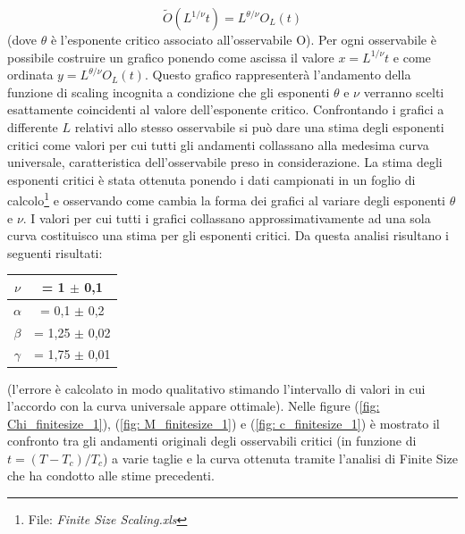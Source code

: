 \begin{displaymath}
	\tilde{O}(L^{1/ \nu} t ) = L^{\theta / \nu}O_L(t)
\end{displaymath}
(dove $\theta$ è l'esponente critico associato all'osservabile O).
Per ogni osservabile è possibile costruire un grafico ponendo come ascissa il valore $x = L^{1/ \nu} t $ e come ordinata
$y = L^{\theta / \nu}O_L(t)$. 
Questo grafico rappresenterà l'andamento della funzione di scaling incognita a condizione che gli esponenti $ \theta $ e $ \nu $ verranno scelti esattamente coincidenti al valore dell'esponente critico.
Confrontando i grafici a differente $L$ relativi allo stesso osservabile si può dare una stima degli esponenti critici come valori per cui tutti gli andamenti collassano alla medesima curva universale, caratteristica dell'osservabile preso in considerazione.
\medskip \newline
La stima degli esponenti critici è stata ottenuta ponendo i dati campionati in un foglio di calcolo\footnote{File: \emph{Finite Size Scaling.xls}} e osservando come cambia la forma dei grafici al variare degli esponenti $\theta$ e $\nu$. I valori per cui tutti i grafici collassano approssimativamente ad una sola curva costituisco una stima per gli esponenti critici.
Da questa analisi risultano i seguenti risultati:
\begin{center}
\begin{tabular}{|c|c|}
\hline
	$ \nu $ &= 1 $\pm$ 0,1 \\
\hline
	$ \alpha $ &= 0,1 $\pm$ 0,2 \\
\hline
	$ \beta $ &= 1,25 $\pm$ 0,02 \\
\hline
	$ \gamma $ &= 1,75 $\pm$ 0,01 \\
\hline
\end{tabular}
\end{center}
(l'errore è calcolato in modo qualitativo stimando l'intervallo di valori in cui l'accordo con la curva universale appare ottimale).
Nelle figure (\ref{fig: Chi_finitesize_1}), (\ref{fig: M_finitesize_1}) e (\ref{fig: c_finitesize_1}) è mostrato il confronto tra gli andamenti originali degli osservabili critici (in funzione di $t= (T-T_c) / T_c$) a varie taglie e la curva ottenuta tramite l'analisi di Finite Size che ha condotto alle stime precedenti.


